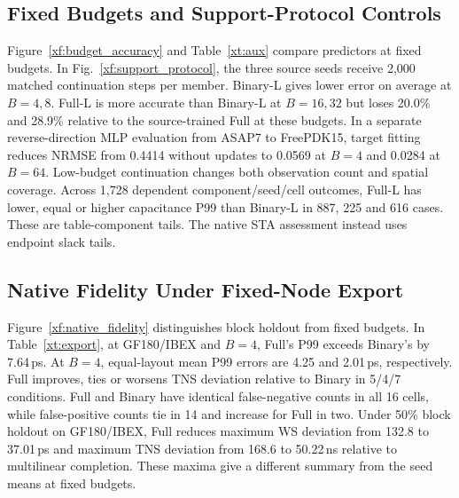 \subsection{Fixed Budgets and Support-Protocol Controls}
Figure~\ref{xf:budget_accuracy} and Table~\ref{xt:aux} compare predictors at fixed budgets. In Fig.~\ref{xf:support_protocol}, the three source seeds receive 2,000 matched continuation steps per member. Binary-L gives lower error on average at $B=4,8$. Full-L is more accurate than Binary-L at $B=16,32$ but loses 20.0\% and 28.9\% relative to the source-trained Full at these budgets. In a separate reverse-direction MLP evaluation from ASAP7 to FreePDK15, target fitting reduces NRMSE from 0.4414 without updates to 0.0569 at $B=4$ and 0.0284 at $B=64$. Low-budget continuation changes both observation count and spatial coverage. Across 1,728 dependent component/seed/cell outcomes, Full-L has lower, equal or higher capacitance P99 than Binary-L in 887, 225 and 616 cases. These are table-component tails. The native STA assessment instead uses endpoint slack tails.
\clearpage
\subsection{Native Fidelity Under Fixed-Node Export}
Figure~\ref{xf:native_fidelity} distinguishes block holdout from fixed budgets. In Table~\ref{xt:export}, at GF180/IBEX and $B=4$, Full's P99 exceeds Binary's by 7.64\,ps. At $B=4$, equal-layout mean P99 errors are 4.25 and 2.01\,ps, respectively. Full improves, ties or worsens TNS deviation relative to Binary in 5/4/7 conditions. Full and Binary have identical false-negative counts in all 16 cells, while false-positive counts tie in 14 and increase for Full in two. Under 50\% block holdout on GF180/IBEX, Full reduces maximum WS deviation from 132.8 to 37.01\,ps and maximum TNS deviation from 168.6 to 50.22\,ns relative to multilinear completion. These maxima give a different summary from the seed means at fixed budgets.
\clearpage
